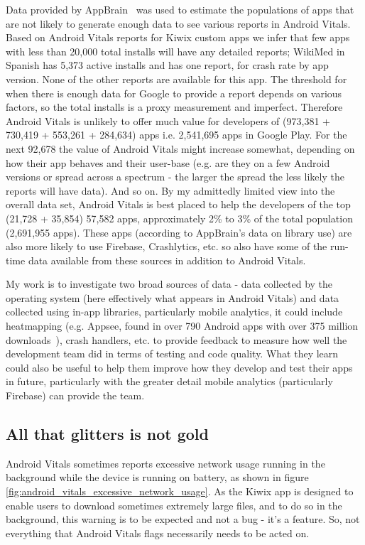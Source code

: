 Data provided by AppBrain~\cite{appbrain_download_statistics_june_2019} was used to estimate the populations of apps that are not likely to generate enough data to see various reports in Android Vitals.
% 
Based on Android Vitals reports for Kiwix custom apps we infer that few apps with less than 20,000 total installs will have any detailed reports; WikiMed in Spanish has 5,373 active installs and has one report, for crash rate by app version. None of the other reports are available for this app. The threshold for when there is enough data for Google to provide a report depends on various factors, so the total installs is a proxy measurement and imperfect. Therefore Android Vitals is unlikely to offer much value for developers of (973,381 + 730,419 + 553,261 + 284,634) apps i.e. 2,541,695 apps in Google Play. For the next 92,678 the value of Android Vitals might increase somewhat, depending on how their app behaves and their user-base (e.g. are they on a few Android versions or spread across a spectrum - the larger the spread the less likely the reports will have data). And so on. By my admittedly limited view into the overall data set, Android Vitals is best placed to help the developers of the top (21,728 + 35,854) 57,582 apps, approximately 2\% to 3\% of the total population (2,691,955 apps). These apps (according to AppBrain's data on library use) are also more likely to use Firebase, Crashlytics, etc. so also have some of the run-time data available from these sources in addition to Android Vitals.

My work is to investigate two broad sources of data - data collected by the operating system (here effectively what appears in Android Vitals) and data collected using in-app libraries, particularly mobile analytics, it could include heatmapping (e.g. Appsee, found in over 790 Android apps with over 375 million downloads~\cite{appbrain_appsee}), crash handlers, etc. to provide feedback to measure how well the development team did in terms of testing and code quality. What they learn could also be useful to help them improve how they develop and test their apps in future, particularly with the greater detail mobile analytics (particularly Firebase) can provide the team.

\subsection{All that glitters is not gold}
Android Vitals sometimes reports excessive network usage running in the background while the device is running on battery, as shown in figure \ref{fig:android_vitals_excessive_network_usage}. As the Kiwix app is designed to enable users to download sometimes extremely large files, and to do so in the background, this warning is to be expected and not a bug - it's a feature. So, not everything that Android Vitals flags necessarily needs to be acted on. %

